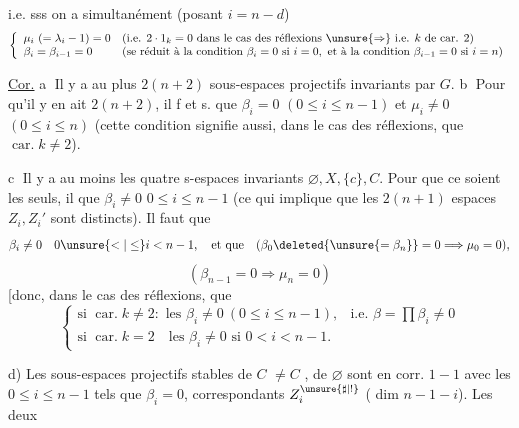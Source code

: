 
i.e. sss on a simultanément (posant $i=n-d$)
\[
\left\{
\begin{array}{ll}
\mu_i\ (= \lambda_i-1)=0&
\text{(i.e. }2\cdot1_k=0\text{ dans le cas des réflexions }\unsure{\Rightarrow}\text{ i.e. }k\text{ de car. }2)\\
\beta_i=\beta_{i-1}=0&
\text{(se réduit à la condition }\beta_i=0\text{ si }i=0,\text{ et à la condition }\beta_{i-1}=0\text{ si }i=n)
\end{array}\right.
\]


\uline{Cor.} \textcircled{a} Il y a au plus $2(n+2)$ sous-espaces projectifs invariants par $G$. \textcircled{b} Pour qu'il y en ait $2(n+2)$, il f et s. que $\beta_i=0$ $(0\leq i\leq n-1)$ et $\mu_i\neq0$  $(0\leq i\leq n)$ (cette condition signifie aussi, dans le cas des réflexions, que $\operatorname{car.}k\neq2$).

\textcircled{c}  Il y a au moins les quatre s-espaces invariants $\varnothing,X,\{c\},C$. Pour que ce soient les seuls, il   que $\beta_i\neq0$ $0\leq i\leq n-1$ (ce qui implique que les $2(n+1)$ espaces $Z_i,Z_i'$ sont distincts). Il faut  que
\[
\beta_i\neq0\quad0\unsure{<|\leq}i<n-1,
\quad\text{et que}\quad
(\beta_0\deleted{\unsure{=\beta_n}}=0\Longrightarrow\mu_0=0),
\]
\[
(\beta_{n-1}=0\Longrightarrow\mu_n=0)
\]
[donc, dans le cas des réflexions, que
\[
\left\{
\begin{array}{ll}
\text{si }\operatorname{car.}k\neq2:\text{ les }\beta_i\neq0\ (0\leq i\leq n-1),
&\text{i.e. }\beta=\prod\beta_i\neq0\\
\text{si }\operatorname{car.}k=2\quad\text{les }\beta_i\neq0\text{ si }0<i<n-1.&
\end{array}
\right.
\]



d) Les sous-espaces projectifs stables de $C$ $\neq C$ , de $\varnothing$  sont en corr. $1-1$ avec les $0\leq i\leq n-1$ tels que $\beta_i=0$,   correspondants $Z_i^{\unsure{\sharp|!}}$ ( dim $n-1-i$). Les deux


